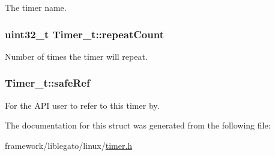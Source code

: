 The timer name. 

\subsubsection[{\texorpdfstring{repeat\+Count}{repeatCount}}]{\setlength{\rightskip}{0pt plus 5cm}uint32\+\_\+t Timer\+\_\+t\+::repeat\+Count}\hypertarget{struct_timer__t_a0f131253258fae2014ea54c09b34b21c}{}\label{struct_timer__t_a0f131253258fae2014ea54c09b34b21c}


Number of times the timer will repeat. 

\subsubsection[{\texorpdfstring{safe\+Ref}{safeRef}}]{ Timer\+\_\+t\+::safe\+Ref}\hypertarget{struct_timer__t_afe5762bc74307321b2575859dafc9135}{}\label{struct_timer__t_afe5762bc74307321b2575859dafc9135}


For the A\+PI user to refer to this timer by. 



The documentation for this struct was generated from the following file\+:\begin{DoxyCompactItemize}
\item 
framework/liblegato/linux/\hyperlink{timer_8h}{timer.\+h}\end{DoxyCompactItemize}
